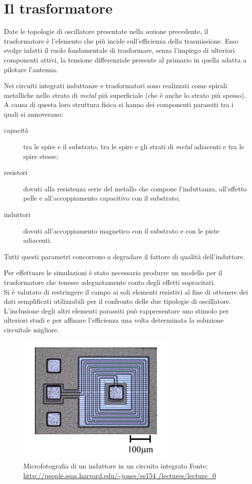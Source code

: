 \documentclass[a4paper, 12pt]{memoir}
\begin{document}
\section{Il trasformatore}
Date le topologie di oscillatore presentate nella sezione precedente, il
trasformatore è l'elemento che più incide sull'efficienza della trasmissione.
Esso svolge infatti il ruolo fondamentale di trasformare, senza l'impiego di
ulteriori componenti attivi, la tensione differenziale presente al primario in
quella adatta a pilotare l'antenna\cite{Neviani14}.

Nei circuiti integrati induttanze e trasformatori sono realizzati come
spirali metalliche nello strato di \emph{metal} più superficiale (che è anche
lo strato più spesso).\\
A causa di questa loro struttura fisica si hanno dei componenti parassiti tra i
quali si annoverano\cite[pp. 431-455]{RazaviRF}:
\begin{description}
\item[capacità] tra le spire e il substrato, tra le spire e gli strati di
	\emph{metal} adiacenti e tra le spire stesse;
\item [resistori] dovuti alla resistenza serie del metallo che compone
	l'induttanza, all'effetto pelle e all'accoppiamento capacitivo con il
	substrato;
\item [induttori] dovuti all'accoppiamento magnetico con il substrato e con le 
	piste adiacenti.
\end{description}
Tutti questi parametri concorrono a degradare il fattore di qualità
dell'induttore.

Per effettuare le simulazioni è stato necessario produrre un modello per il
trasformatore che tenesse adeguatamente conto degli effetti sopracitati.\\
Si è valutato di restringere il campo ai soli elementi resistivi al fine di
ottenere dei dati semplificati utilizzabili per il confronto delle due
tipologie di oscillatore. L'inclusione degli altri elementi parassiti può
rappresentare uno stimolo per ulteriori studi e per affinare l'efficienza una
volta determinata la soluzione circuitale migliore.
\begin{figure}[h]
\centering
\includegraphics[height=0.2\textheight]{images/ic_inductor.JPG}
\caption{Microfotografia di un induttore in un circuito integrato
	\hspace{\textwidth} %
	\footnotesize{Fonte: \url{http://people.seas.harvard.edu/~jones/es154
	/lectures/lecture_0}}}
\end{figure}
\end{document}

